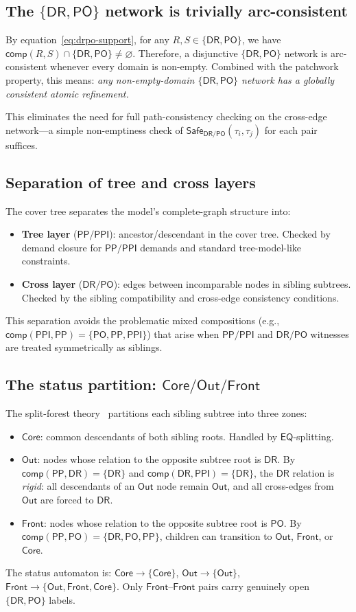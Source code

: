 \documentclass[a4paper,11pt]{article}
\theoremstyle{definition}
\newcommand{\DR}{\ensuremath{\mathsf{DR}}}
\newcommand{\PO}{\ensuremath{\mathsf{PO}}}
\newcommand{\EQ}{\ensuremath{\mathsf{EQ}}}
\newcommand{\PP}{\ensuremath{\mathsf{PP}}}
\newcommand{\PPI}{\ensuremath{\mathsf{PPI}}}
\newcommand{\comp}{\ensuremath{\mathsf{comp}}}
\newcommand{\Safe}{\ensuremath{\mathsf{Safe}}}
\newcommand{\Core}{\ensuremath{\mathsf{Core}}}
\newcommand{\Out}{\ensuremath{\mathsf{Out}}}
\newcommand{\Front}{\ensuremath{\mathsf{Front}}}
\begin{document}
\subsection{The $\{\DR,\PO\}$ network is trivially arc-consistent}

By equation~\eqref{eq:drpo-support}, for any
$R, S \in \{\DR, \PO\}$, we have
$\comp(R, S) \cap \{\DR, \PO\} \neq \varnothing$.
Therefore, a disjunctive $\{\DR,\PO\}$ network is arc-consistent
whenever every domain is non-empty.  Combined with the patchwork
property, this means: \emph{any non-empty-domain $\{\DR,\PO\}$
network has a globally consistent atomic refinement.}

This eliminates the need for full path-consistency checking on the
cross-edge network---a simple non-emptiness check of
$\Safe_{\DR/\PO}(\tau_i, \tau_j)$ for each pair suffices.

\subsection{Separation of tree and cross layers}

The cover tree separates the model's complete-graph structure into:
\begin{itemize}[nosep]
  \item \textbf{Tree layer} ($\PP/\PPI$): ancestor/descendant in
    the cover tree.  Checked by demand closure for $\PP/\PPI$
    demands and standard tree-model-like constraints.
  \item \textbf{Cross layer} ($\DR/\PO$): edges between
    incomparable nodes in sibling subtrees.  Checked by the
    sibling compatibility and cross-edge consistency conditions.
\end{itemize}
This separation avoids the problematic mixed compositions
(e.g., $\comp(\PPI, \PP) = \{\PO, \PP, \PPI\}$) that arise
when $\PP/\PPI$ and $\DR/\PO$ witnesses are treated symmetrically
as siblings.

\subsection{The status partition: $\Core/\Out/\Front$}

The split-forest theory~\cite{SiblingCompleted} partitions each
sibling subtree into three zones:
\begin{itemize}[nosep]
  \item $\Core$: common descendants of both sibling roots.
    Handled by $\EQ$-splitting.
  \item $\Out$: nodes whose relation to the opposite subtree root
    is $\DR$.  By $\comp(\PP,\DR) = \{\DR\}$ and
    $\comp(\DR,\PPI) = \{\DR\}$, the $\DR$ relation is
    \emph{rigid}: all descendants of an $\Out$ node remain $\Out$,
    and all cross-edges from $\Out$ are forced to $\DR$.
  \item $\Front$: nodes whose relation to the opposite subtree
    root is $\PO$.  By $\comp(\PP,\PO) = \{\DR,\PO,\PP\}$,
    children can transition to $\Out$, $\Front$, or $\Core$.
\end{itemize}
The status automaton is:
$\Core \to \{\Core\}$, $\Out \to \{\Out\}$,
$\Front \to \{\Out, \Front, \Core\}$.
Only $\Front$--$\Front$ pairs carry genuinely open $\{\DR,\PO\}$
labels.
\end{document}
